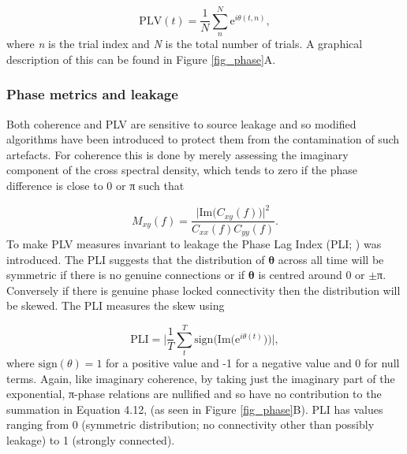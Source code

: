 \begin{equation}
\text{PLV}(t) = \frac{1}{N}\sum_{n}^{N}\text{e}^{i\theta(t,n)},
\end{equation} where \textit{n} is the trial index and \textit{N} is the total number of trials. A graphical description of this can be found in Figure \ref{fig_phase}A.

\subsubsection{Phase metrics and leakage}
Both coherence and PLV are sensitive to source leakage and so modified algorithms have been introduced to protect them from the contamination of such artefacts. For coherence this is done by merely assessing the imaginary component of the cross spectral density, which tends to zero if the phase difference is close to 0 or π \citep{Nolte2004} such that

\begin{equation}
M_{xy}(f) = \frac{\big|\text{Im}\big(C_{xy}(f)\big)\big|^2}{C_{xx}(f)C_{yy}(f)}.
\end{equation} To make PLV measures invariant to leakage the Phase Lag Index (PLI; \citealp{Stam2007}) was introduced. The PLI suggests that the distribution of $\mathbf{\theta}$ across all time will be symmetric if there is no genuine connections or if $ \mathbf{\theta} $ is centred around 0 or $\pm$π. Conversely if there is genuine phase locked connectivity then the distribution will be skewed. The PLI measures the skew using

\begin{equation}
\text{PLI} = \Bigg|\frac{1}{T}\sum_{t}^{T}\text{sign}\Big(\text{Im}\big(\text{e}^{i\theta(t)}\big)\Big)\Bigg|,
\end{equation} where $\text{sign}(\theta)=1$ for a positive value and -1 for a negative value and 0 for null terms. Again, like imaginary coherence, by taking just the imaginary part of the exponential, π-phase relations are nullified and so have no contribution to the summation in Equation 4.12, (as seen in Figure \ref{fig_phase}B). PLI has values ranging from 0 (symmetric distribution; no connectivity other than possibly leakage) to 1 (strongly connected).


